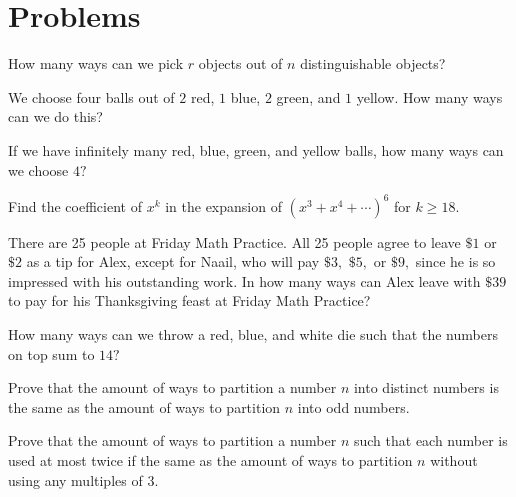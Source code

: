 \documentclass[mast]{lucky}
\begin{document}
\pagebreak

\section{Problems}


\begin{prob}{1}
How many ways can we pick $r$ objects out of $n$ distinguishable objects?
\end{prob}
    
\begin{prob}[]{2}
We choose four balls out of $2$ red, $1$ blue, $2$ green, and $1$ yellow. How many ways can we do this?
\end{prob}
    
\begin{prob}[]{2}
If we have infinitely many red, blue, green, and yellow balls, how many ways can we choose $4?$
\end{prob}
    
\begin{prob}[]{3}
Find the coefficient of $x^k$ in the expansion of $(x^3+x^4+\cdots)^6$ for $k\geq 18.$
\end{prob}

\begin{prob}[]{3}
There are 25 people at Friday Math Practice. All 25 people agree to leave $\$1$ or $\$2$ as a tip for Alex, except for Naail, who will pay $\$3,$ $\$5,$ or $\$9,$ since he is so impressed with his outstanding work. In how many ways can Alex leave with $\$39$ to pay for his Thanksgiving feast at Friday Math Practice?
\end{prob}

\begin{prob}[]{3}
How many ways can we throw a red, blue, and white die such that the numbers on top sum to $14?$
\end{prob}
    
\begin{prob}[]{4}
Prove that the amount of ways to partition a number $n$ into distinct numbers is the same as the amount of ways to partition $n$ into odd numbers.
\end{prob}
    
\begin{prob}[]{4}
Prove that the amount of ways to partition a number $n$ such that each number is used at most twice if the same as the amount of ways to partition $n$ without using any multiples of $3.$
\end{prob}
\end{document}
